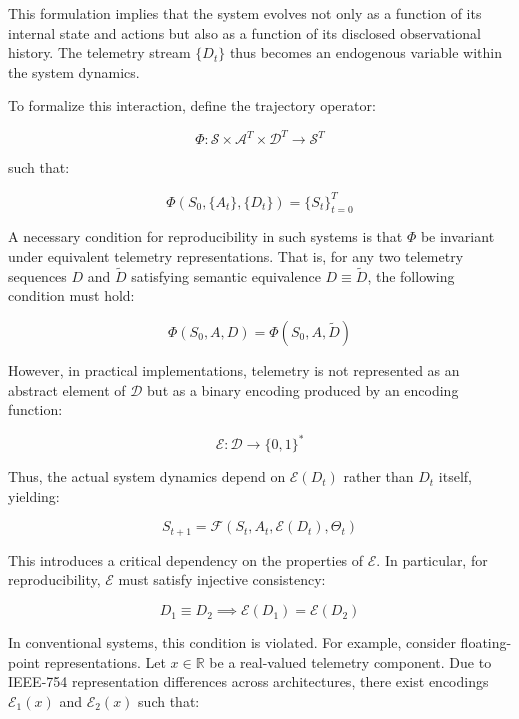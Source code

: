 This formulation implies that the system evolves not only as a function of its internal state and actions but also as a function of its disclosed observational history. The telemetry stream $\{D_t\}$ thus becomes an endogenous variable within the system dynamics.

To formalize this interaction, define the trajectory operator:

\begin{equation}
\Phi: \mathcal{S} \times \mathcal{A}^{T} \times \mathcal{D}^{T} \rightarrow \mathcal{S}^{T}
\end{equation}

such that:

\begin{equation}
\Phi(S_0, \{A_t\}, \{D_t\}) = \{S_t\}_{t=0}^{T}
\end{equation}

A necessary condition for reproducibility in such systems is that $\Phi$ be invariant under equivalent telemetry representations. That is, for any two telemetry sequences $D$ and $\tilde{D}$ satisfying semantic equivalence $D \equiv \tilde{D}$, the following condition must hold:

\begin{equation}
\Phi(S_0, A, D) = \Phi(S_0, A, \tilde{D})
\end{equation}

However, in practical implementations, telemetry is not represented as an abstract element of $\mathcal{D}$ but as a binary encoding produced by an encoding function:

\begin{equation}
\mathcal{E}: \mathcal{D} \rightarrow \{0,1\}^*
\end{equation}

Thus, the actual system dynamics depend on $\mathcal{E}(D_t)$ rather than $D_t$ itself, yielding:

\begin{equation}
S_{t+1} = \mathcal{F}(S_t, A_t, \mathcal{E}(D_t), \Theta_t)
\end{equation}

This introduces a critical dependency on the properties of $\mathcal{E}$. In particular, for reproducibility, $\mathcal{E}$ must satisfy injective consistency:

\begin{equation}
D_1 \equiv D_2 \implies \mathcal{E}(D_1) = \mathcal{E}(D_2)
\end{equation}

In conventional systems, this condition is violated. For example, consider floating-point representations. Let $x \in \mathbb{R}$ be a real-valued telemetry component. Due to IEEE-754 representation differences across architectures, there exist encodings $\mathcal{E}_1(x)$ and $\mathcal{E}_2(x)$ such that:

